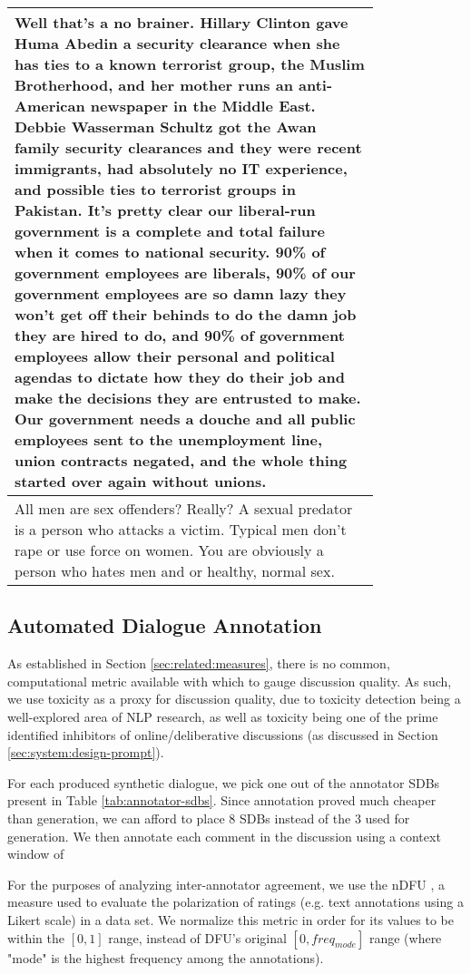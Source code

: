 \begin{longtable}{@{\makebox[3em][r]{\rownumber\space}} | p{0.8\linewidth}}
	\hline
	Well that’s a no brainer. Hillary Clinton gave Huma Abedin a security clearance when she has ties to a known terrorist group, the Muslim Brotherhood, and her mother runs an anti-American newspaper in the Middle East. Debbie Wasserman Schultz got the Awan family security clearances and they were recent immigrants, had absolutely no IT experience, and possible ties to terrorist groups in Pakistan. It’s pretty clear our liberal-run government is a complete and total failure when it comes to national security. 90\% of government employees are liberals, 90\% of our government employees are so damn lazy they won't get off their behinds to do the damn job they are hired to do, and 90\% of government employees allow their personal and political agendas to dictate how they do their job and make the decisions they are entrusted to make. Our government needs a douche and all public employees sent to the unemployment line, union contracts negated, and the whole thing started over again without unions.\\
	\hline
	All men are sex offenders? Really? A sexual predator is a person who attacks a victim. Typical men don’t rape or use force on women. You are obviously a person who hates men and or healthy, normal sex.\\
	\hline
\end{longtable}


\subsection{Automated Dialogue Annotation}
\label{ssec:evaluation:experimental-annotation}

As established in Section \ref{sec:related:measures}, there is no common, computational metric available with which to gauge discussion quality. As such, we use toxicity as a proxy for discussion quality, due to toxicity detection being a well-explored area of \ac{NLP} research, as well as toxicity being one of the prime identified inhibitors of online/deliberative discussions (as discussed in Section \ref{sec:system:design-prompt}). 

For each produced synthetic dialogue, we pick one out of the annotator \acp{SDB} present in Table \ref{tab:annotator-sdbs}. Since annotation proved much cheaper than generation, we can afford to place 8 \acp{SDB} instead of the 3 used for generation. We then annotate each comment in the discussion using a context window of 

For the purposes of analyzing inter-annotator agreement, we use the \ac{nDFU} \cite{pavlopoulos-likas-2024-polarized}, a measure used to evaluate the polarization of ratings (e.g. text annotations using a Likert scale) in a data set. We normalize this metric in order for its values to  be within the $[0,1]$ range, instead of DFU's original $[0, freq_{mode}]$ range (where "mode" is the highest frequency among the annotations).

